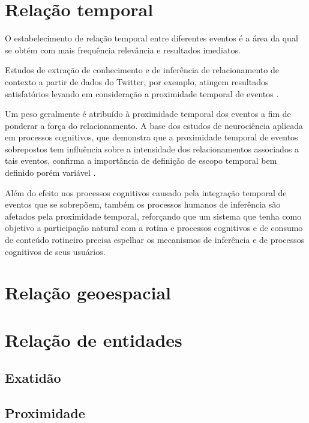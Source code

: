 \section{Relação temporal}

O estabelecimento de relação temporal entre diferentes eventos é a área da qual se obtém com mais frequência relevância e resultados imediatos.

Estudos de extração de conhecimento e de inferência de relacionamento de contexto a partir de dados do Twitter, por exemplo, atingem resultados satisfatórios levando em consideração a proximidade temporal de eventos \cite{extracting:fromtwitter}.

Um peso geralmente é atribuído à proximidade temporal dos eventos a fim de ponderar a força do relacionamento. A base dos estudos de neurociência aplicada em processos cognitivos, que demonstra que a proximidade temporal de eventos sobrepostos tem influência sobre a intensidade dos relacionamentos associados a tais eventos, confirma a importância de definição de escopo temporal bem definido porém variável \cite{Zeithamova2017TemporalPP}.

Além do efeito nos processos cognitivos causado pela integração temporal de eventos que se sobrepõem, também os processos humanos de inferência são afetados pela proximidade temporal, reforçando que um sistema que tenha como objetivo a participação natural com a rotina e processos cognitivos e de consumo de conteúdo rotineiro precisa espelhar os mecanismos de inferência e de processos cognitivos de seus usuários.

\section{Relação geoespacial}
\section{Relação de entidades}
\subsection{Exatidão}
\subsection{Proximidade}